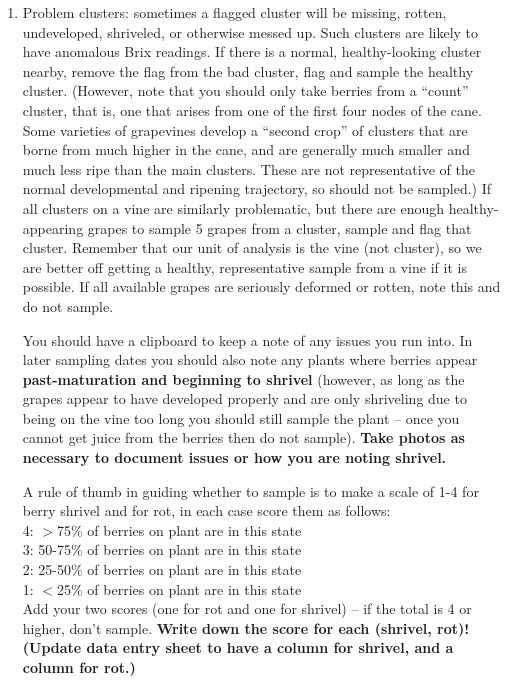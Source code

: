 \documentclass[11pt,letter]{article}
\begin{document}
\begin{enumerate}
\item Problem clusters: sometimes a flagged cluster will be missing, rotten, undeveloped, shriveled, or otherwise messed up. Such clusters are likely to have anomalous Brix readings. If there is a normal, healthy-looking cluster nearby, remove the flag from the bad cluster, flag and sample the healthy cluster. (However, note that you should only take berries from a “count” cluster, that is, one that arises from one of the first four nodes of the cane. Some varieties of grapevines develop a “second crop” of clusters that are borne from much higher in the cane, and are generally much smaller and much less ripe than the main clusters. These are not representative of the normal developmental and ripening trajectory, so should not be sampled.)  If all clusters on a vine are similarly problematic, but there are enough healthy-appearing grapes to sample 5 grapes from a cluster, sample and flag that cluster. Remember that our unit of analysis is the vine (not cluster), so we are better off getting a healthy, representative sample from a vine if it is possible. If all available grapes are seriously deformed or rotten, note this and do not sample. %

You should have a clipboard to keep a note of any issues you run into. In later sampling dates you should also note any plants where berries appear {\bf past-maturation and beginning to shrivel} (however, as long as the grapes appear to have developed properly and are only shriveling due to being on the vine too long you should still sample the plant -- once you cannot get juice from the berries then do not sample). {\bf Take photos as necessary to document issues or how you are noting shrivel.}

A rule of thumb in guiding whether to sample is to make a scale of 1-4 for berry shrivel and for rot, in each case score them as follows: \\
4: $>$75\% of berries on plant are in this state \\
3: 50-75\% of berries on plant are in this state \\
2: 25-50\% of berries on plant are in this state \\
1: $<$25\% of berries on plant are in this state \\
Add your two scores (one for rot and one for shrivel) -- if the total is 4 or higher, don't sample. {\bf Write down the score for each (shrivel, rot)! (Update data entry sheet to have a column for shrivel, and a column for rot.)}


\end{enumerate}
\end{document}
